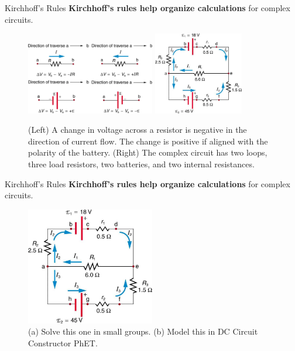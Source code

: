 \documentclass{beamer}
\begin{document}
\begin{frame}{Kirchhoff's Rules}
\small
\textbf{\alert{Kirchhoff's rules help organize calculations}} for complex circuits.
\begin{figure}
\includegraphics[width=0.5\textwidth]{figures/complex_2.png} \hspace{1cm}
\includegraphics[width=0.35\textwidth]{figures/complex_1.png}
\caption{\label{fig:kirch1} (Left) A change in voltage across a resistor is negative in the direction of current flow.  The change is positive if aligned with the polarity of the battery. (Right) The complex circuit has two loops, three load resistors, two batteries, and two internal resistances.}
\end{figure}
\end{frame}

\begin{frame}{Kirchhoff's Rules}
\small
\textbf{\alert{Kirchhoff's rules help organize calculations}} for complex circuits.
\begin{figure}
\includegraphics[width=0.5\textwidth]{figures/complex_1.png}
\caption{\label{fig:kirch2} (a) Solve this one in small groups. (b) Model this in DC Circuit Constructor PhET.}
\end{figure}
\end{frame}
\end{document}
